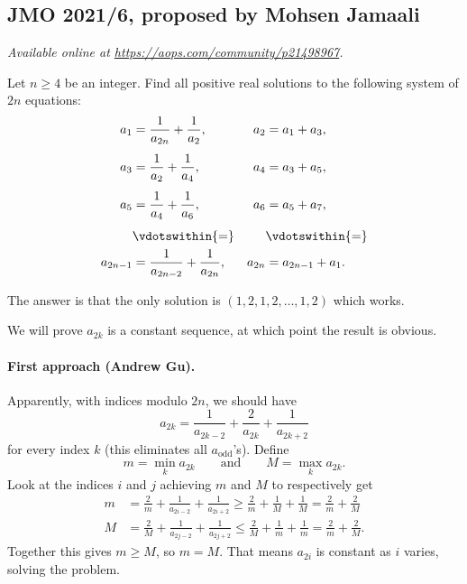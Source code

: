 \documentclass[11pt]{scrartcl}
\begin{document}
\subsection{JMO 2021/6, proposed by Mohsen Jamaali}
\textsl{Available online at \url{https://aops.com/community/p21498967}.}
\begin{mdframed}[style=mdpurplebox,frametitle={Problem statement}]
Let $n \ge 4$ be an integer.
Find all positive real solutions to the following
system of $2n$ equations:
\begin{align*}
  a_1 &= \frac{1}{a_{2n}} + \frac{1}{a_{2}}, & a_2 &= a_1 + a_3, \\[1ex]
  a_3 &= \frac{1}{a_{2}} + \frac{1}{a_{4}}, & a_4 &= a_3 + a_5, \\[1ex]
  a_5 &= \frac{1}{a_{4}} + \frac{1}{a_{6}}, & a_6 &= a_5 + a_7, \\[1ex]
  &\vdotswithin{=} &&\vdotswithin{=} \\
  a_{2n-1} &= \frac{1}{a_{2n-2}} + \frac{1}{a_{2n}}, & a_{2n} &= a_{2n-1} + a_1.
\end{align*}
\end{mdframed}
The answer is that the only solution is
$(1,2,1,2,\dots,1,2)$ which works.

We will prove $a_{2k}$ is a constant sequence,
at which point the result is obvious.

\paragraph{First approach (Andrew Gu).}
Apparently, with indices modulo $2n$, we should have
\[ a_{2k} = \frac{1}{a_{2k-2}}
  + \frac{2}{a_{2k}} + \frac{1}{a_{2k+2}} \]
for every index $k$ (this eliminates all $a_{\text{odd}}$'s).
Define
\[ m = \min_k a_{2k} \qquad\text{and}\qquad M = \max_k a_{2k}. \]
Look at the indices $i$ and $j$
achieving $m$ and $M$ to respectively get
\begin{align*}
  m &= \frac2m + \frac{1}{a_{2i-2}} + \frac{1}{a_{2i+2}}
  \ge \frac2m + \frac1M + \frac1M  = \frac2m + \frac2M \\[1ex]
  M &= \frac2M + \frac{1}{a_{2j-2}} + \frac{1}{a_{2j+2}}
  \le \frac2M + \frac1m + \frac1m = \frac2m + \frac2M.
\end{align*}
Together this gives $m \ge M$, so $m = M$.
That means $a_{2i}$ is constant as $i$ varies,
solving the problem.
\end{document}
